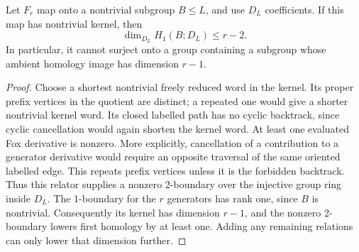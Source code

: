\begin{lemma}\label{gate:free-quotient}
Let $F_r$ map onto a nontrivial subgroup $B\le L$, and use $D_L$
coefficients.  If this map has nontrivial kernel, then
\[
 \dim_{D_L}H_1(B;D_L)\le r-2.
\]
In particular, it cannot surject onto a group containing a subgroup whose
ambient homology image has dimension $r-1$.
\end{lemma}
\begin{proof}
Choose a shortest nontrivial freely reduced word in the kernel.  Its
proper prefix vertices in the quotient are distinct; a repeated one
would give a shorter nontrivial kernel word.  Its closed labelled path
has no cyclic backtrack, since cyclic cancellation would again shorten
the kernel word.  At least one evaluated Fox derivative is nonzero.
More explicitly, cancellation of a contribution to a generator derivative
would require an opposite traversal of the same oriented labelled edge.
This repeats prefix vertices unless it is the forbidden backtrack.
Thus this relator supplies a nonzero 2-boundary over the injective group
ring inside $D_L$.  The 1-boundary for the $r$ generators has rank one,
since $B$ is nontrivial.  Consequently its kernel has dimension $r-1$,
and the nonzero 2-boundary lowers first homology by at least one.  Adding
any remaining relations can only lower that dimension further.
\end{proof}

